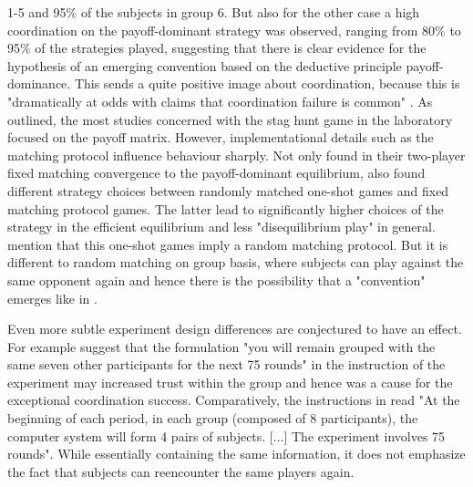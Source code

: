 \documentclass[11pt]{article}
\begin{document}
1-5 and 95\% of the subjects in group 6. But also for the other case a high
coordination on the payoff-dominant strategy was observed, ranging from 
80\% to 95\% of the strategies played, suggesting that there is clear evidence
for the hypothesis of an emerging convention based on the deductive principle
payoff-dominance. This sends a quite positive image about coordination, because 
this is "dramatically at odds with claims that coordination failure is common"
\parencite[9]{devetag_when_2007}. 
As outlined, the most studies concerned with the stag hunt game in the 
laboratory focused on the payoff matrix. However, implementational details 
such as the matching protocol influence behaviour sharply. Not only 
\textcite{van_huyck_tacit_1990} found in their two-player fixed matching
convergence to the payoff-dominant equilibrium, 
\textcite{clark_repetition_2001} also found different strategy 
choices between randomly matched one-shot games and fixed matching protocol 
games. The latter lead to significantly higher choices of the strategy 
in the efficient equilibrium and less "disequilibrium play" in general. 
\textcite{devetag_when_2007} mention that this one-shot games imply a 
random matching protocol. But it is different to random matching on group
basis, where subjects can play against the same opponent again 
and hence there is the possibility that a "convention" emerges like in 
\cite{rankin_strategic_2000}.

Even more subtle experiment design differences are conjectured to have an
effect. For example \textcite{devetag_when_2007} suggest that the formulation
"you will remain grouped with the same seven other participants for the next
75 rounds" in the instruction of the \textcite{rankin_strategic_2000} 
experiment may increased trust within the group and hence was a 
cause for the exceptional coordination success. Comparatively, the 
instructions in \textcite{dubois_optimization_2012} read "At the beginning
of each period, in each group (composed of 8 participants), the computer
system will form 4 pairs of subjects. [...] The experiment 
involves 75 rounds". While essentially containing the same information,
it does not emphasize the fact that subjects can reencounter the same 
players again. 
\end{document}
